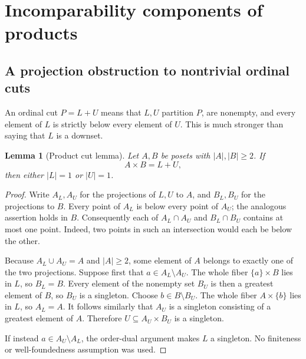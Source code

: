 \documentclass[11pt,letterpaper]{article}
\newtheorem{lemma}[theorem]{Lemma}
\theoremstyle{definition}
\theoremstyle{remark}
\begin{document}
\section{Incomparability components of products}\label{sec:products}

\subsection{A projection obstruction to nontrivial ordinal cuts}
An ordinal cut $P=L+U$ means that $L,U$ partition $P$, are nonempty, and
every element of $L$ is strictly below every element of $U$. This is much
stronger than saying that $L$ is a downset.

\begin{lemma}[Product cut lemma]\label{lem:cut}
Let $A,B$ be posets with $|A|,|B|\ge2$. If
\[
 A\times B=L+U,
\]
then either $|L|=1$ or $|U|=1$.
\end{lemma}
\begin{proof}
Write $A_L,A_U$ for the projections of $L,U$ to $A$, and $B_L,B_U$ for
the projections to $B$. Every point of $A_L$ is below every point of
$A_U$; the analogous assertion holds in $B$. Consequently each of
$A_L\cap A_U$ and $B_L\cap B_U$ contains at most one point. Indeed, two
points in such an intersection would each be below the other.

Because $A_L\cup A_U=A$ and $|A|\ge2$, some element of $A$ belongs to
exactly one of the two projections. Suppose first that
$a\in A_L\setminus A_U$. The whole fiber $\{a\}\times B$ lies in $L$,
so $B_L=B$. Every element of the nonempty set $B_U$ is then a greatest
element of $B$, so $B_U$ is a singleton. Choose
$b\in B\setminus B_U$. The whole fiber $A\times\{b\}$ lies in $L$,
so $A_L=A$. It follows similarly that $A_U$ is a singleton consisting of
a greatest element of $A$. Therefore $U\subseteq A_U\times B_U$ is a
singleton.

If instead $a\in A_U\setminus A_L$, the order-dual argument makes $L$
a singleton. No finiteness or well-foundedness assumption was used.
\end{proof}
\end{document}
